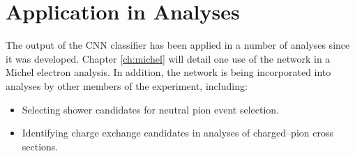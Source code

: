 \section{Application in \protodune{} Analyses} \label{cnn-appl}
The output of the CNN classifier has been applied in a number of \protodune{}
analyses since it was developed. Chapter \ref{ch:michel} will detail one use of
the network in a Michel electron analysis. In addition, the network is being 
incorporated into analyses by other members of the \protodune{} experiment, 
including:
\begin{itemize}
	\item Selecting shower candidates for neutral pion event selection\cite{pi_0}.
	\item Identifying charge exchange candidates in analyses of charged--pion
		cross sections\cite{pion_exchange}.
\end{itemize}
